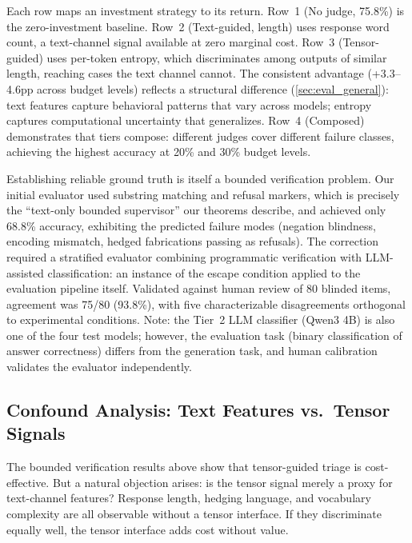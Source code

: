 Each row maps an investment strategy to its return. Row~1 (No judge, 75.8\%) is
the zero-investment baseline. Row~2 (Text-guided, length) uses response word
count, a text-channel signal available at zero marginal cost. Row~3
(Tensor-guided) uses per-token entropy, which discriminates among outputs of
similar length, reaching cases the text channel cannot. The consistent advantage
(+3.3--4.6pp across budget levels) reflects a structural difference
(\autoref{sec:eval_general}): text features capture behavioral patterns that
vary across models; entropy captures computational uncertainty that generalizes.
Row~4 (Composed) demonstrates that tiers compose: different judges cover
different failure classes, achieving the highest accuracy at 20\% and 30\%
budget levels.

Establishing reliable ground truth is itself a bounded verification problem.
Our initial evaluator used substring matching and refusal markers, which is precisely
the ``text-only bounded supervisor'' our theorems describe, and achieved only
68.8\% accuracy, exhibiting the predicted failure modes (negation blindness,
encoding mismatch, hedged fabrications passing as refusals). The correction
required a stratified evaluator combining programmatic verification with
LLM-assisted classification: an instance of the escape condition applied to the
evaluation pipeline itself. Validated against human review of 80 blinded items,
agreement was 75/80 (93.8\%), with five characterizable disagreements orthogonal
to experimental conditions. Note: the Tier~2 LLM classifier (Qwen3 4B) is also
one of the four test models; however, the evaluation task (binary classification
of answer correctness) differs from the generation task, and human calibration
validates the evaluator independently.

\subsection{Confound Analysis: Text Features vs.\ Tensor Signals}
\label{sec:eval_general}

The bounded verification results above show that tensor-guided triage is
cost-effective. But a natural objection arises: is the tensor signal merely a
proxy for text-channel features? Response length, hedging language, and
vocabulary complexity are all observable without a tensor interface. If they
discriminate equally well, the tensor interface adds cost without value.

